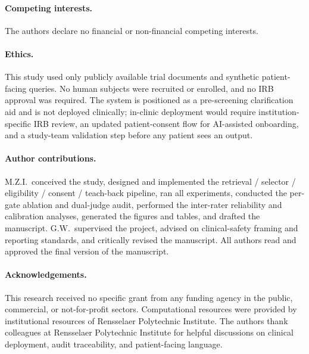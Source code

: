 \documentclass[11pt]{article}
\begin{document}
\paragraph{Competing interests.} The authors declare no financial or non-financial competing interests.

\paragraph{Ethics.} This study used only publicly available trial documents and synthetic patient-facing queries. No human subjects were recruited or enrolled, and no IRB approval was required. The system is positioned as a pre-screening clarification aid and is not deployed clinically; in-clinic deployment would require institution-specific IRB review, an updated patient-consent flow for AI-assisted onboarding, and a study-team validation step before any patient sees an output.

\paragraph{Author contributions.} M.Z.I.\ conceived the study, designed and implemented the retrieval / selector / eligibility / consent / teach-back pipeline, ran all experiments, conducted the per-gate ablation and dual-judge audit, performed the inter-rater reliability and calibration analyses, generated the figures and tables, and drafted the manuscript. G.W.\ supervised the project, advised on clinical-safety framing and reporting standards, and critically revised the manuscript. All authors read and approved the final version of the manuscript.

\paragraph{Acknowledgements.} This research received no specific grant from any funding agency in the public, commercial, or not-for-profit sectors. Computational resources were provided by institutional resources of Rensselaer Polytechnic Institute. The authors thank colleagues at Rensselaer Polytechnic Institute for helpful discussions on clinical deployment, audit traceability, and patient-facing language.



\end{document}
